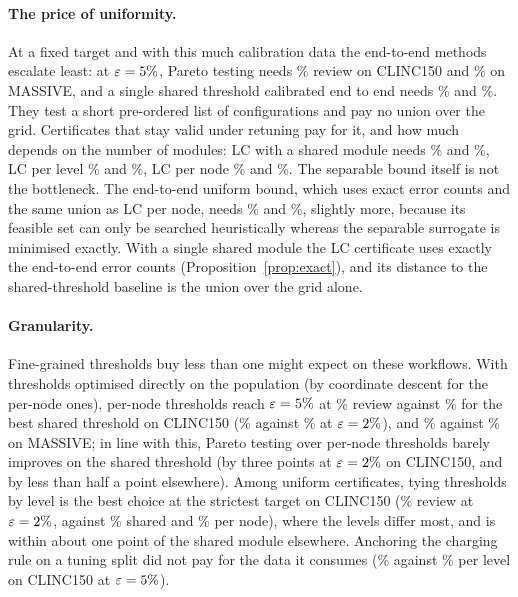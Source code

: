 \paragraph{The price of uniformity.} At a fixed target and with this much calibration data
the end-to-end methods escalate least: at $\varepsilon=5\%$, Pareto testing needs \RevCParetoFive\% review on CLINC150 and \RevMParetoFive\%
on MASSIVE, and a single shared threshold calibrated end to end needs \RevCSharedFive\% and
\RevMSharedFive\%. They test a short pre-ordered list of configurations and pay no union over
the grid. Certificates that stay valid under retuning pay for it, and how much depends on the
number of modules: LC with a shared module needs \RevCLCsharedFive\% and \RevMLCsharedFive\%,
LC per level \RevCLClevelFive\% and \RevMLClevelFive\%, LC per node \RevCLCnodeFive\% and
\RevMLCnodeFive\%. The separable bound itself is not the bottleneck. The end-to-end uniform
bound, which uses exact error counts and the same union as LC per node, needs
\RevCUnifFive\% and \RevMUnifFive\%, slightly more, because its feasible set can only be
searched heuristically whereas the separable surrogate is minimised exactly. With a single shared
module the LC certificate uses exactly the end-to-end error counts
(Proposition~\ref{prop:exact}), and its distance to the shared-threshold baseline is the
union over the grid alone.

\paragraph{Granularity.} Fine-grained thresholds buy less than one might expect on these
workflows. With thresholds optimised directly on the population (by coordinate descent for
the per-node ones), per-node thresholds reach
$\varepsilon=5\%$ at \OracleNodeCFive\% review against \OracleSharedCFive\% for the best shared
threshold on CLINC150 (\OracleNodeCTwo\% against \OracleSharedCTwo\% at $\varepsilon=2\%$), and
\OracleNodeMFive\% against \OracleSharedMFive\% on MASSIVE; in line with this, Pareto testing
over per-node thresholds barely improves on the shared threshold (by three points at
$\varepsilon=2\%$ on CLINC150, and by less than half a point elsewhere). Among uniform
certificates, tying thresholds by level is the best choice at the strictest target on
CLINC150 (\RevCLClevelTwo\% review at $\varepsilon=2\%$, against \RevCLCsharedTwo\% shared and
\RevCLCnodeTwo\% per node), where the levels differ most, and is within about one point of
the shared module elsewhere. Anchoring the charging rule on a tuning split did not pay for the data it
consumes (\RevCAnchFive\% against \RevCLClevelFive\% per level on CLINC150 at $\varepsilon=5\%$).


